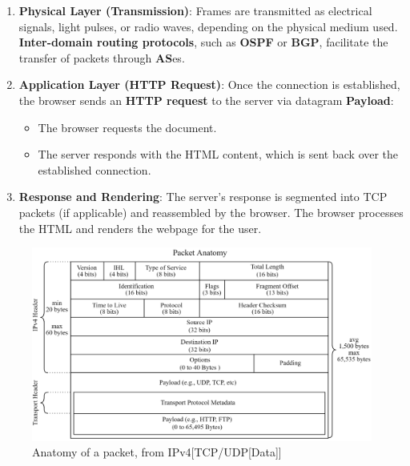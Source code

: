 \begin{theo}
\begin{enumerate}
        \item \textbf{Physical Layer (Transmission)}:
        Frames are transmitted as electrical signals, light pulses, or radio waves, depending on the physical medium used.
        \textbf{Inter-domain routing protocols}, such as \textbf{OSPF} or \textbf{BGP}, facilitate the transfer of packets through \textbf{AS}es.
        
    
        \item \textbf{Application Layer (HTTP Request)}:
        Once the connection is established, the browser sends an \textbf{HTTP request} to the server via datagram \textbf{Payload}:
        \begin{itemize}
            \item The browser requests the document.
            \item The server responds with the HTML content, which is sent back over the established connection.
        \end{itemize}
    
        \item \textbf{Response and Rendering}:
        The server's response is segmented into TCP packets (if applicable) and reassembled by the browser. The browser processes the HTML and renders the webpage for the user.
    \end{enumerate}

\end{theo}

\newpage
    
\begin{figure}[h!]
    \hspace{-2.5em}
    \includegraphics[width=1.1\textwidth]{Sections/network/packet.png}
    \caption{Anatomy of a packet, from IPv4[TCP/UDP[Data]]}
    \label{fig:http}
\end{figure}